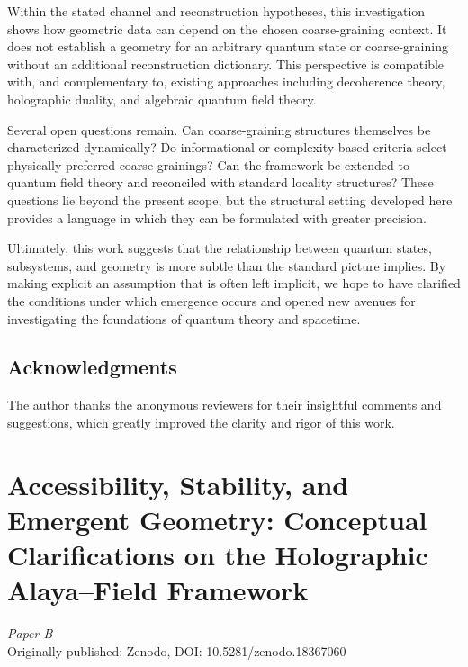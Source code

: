\documentclass[12pt,a4paper,openany]{book}
\begin{document}
Within the stated channel and reconstruction hypotheses, this investigation shows how geometric data can depend on the chosen coarse-graining context. 
It does not establish a geometry for an arbitrary quantum state or coarse-graining without an additional reconstruction dictionary. 
This perspective is compatible with, and complementary to, existing approaches including decoherence theory, holographic duality, and algebraic quantum field theory.

Several open questions remain. 
Can coarse-graining structures themselves be characterized dynamically? 
Do informational or complexity-based criteria select physically preferred coarse-grainings? 
Can the framework be extended to quantum field theory and reconciled with standard locality structures? 
These questions lie beyond the present scope, but the structural setting developed here provides a language in which they can be formulated with greater precision.

Ultimately, this work suggests that the relationship between quantum states, subsystems, and geometry is more subtle than the standard picture implies. 
By making explicit an assumption that is often left implicit, we hope to have clarified the conditions under which emergence occurs and opened new avenues for investigating the foundations of quantum theory and spacetime.

\section*{Acknowledgments}

The author thanks the anonymous reviewers for their insightful comments and suggestions, which greatly improved the clarity and rigor of this work.

\chapter{Accessibility, Stability, and Emergent Geometry: Conceptual Clarifications on the Holographic Alaya--Field Framework}
\label{chap:paperB}

\begin{center}
\textit{Paper B}\\[0.5em]
Originally published: Zenodo, DOI: 10.5281/zenodo.18367060
\end{center}
\end{document}
